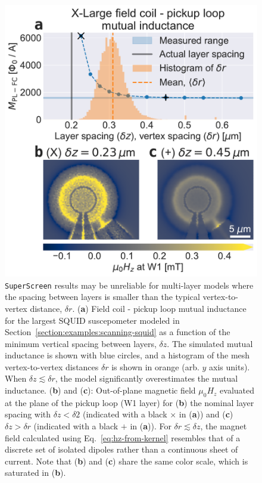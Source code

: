 \documentclass[final,3p,times,twocolumn]{elsarticle}
\newcommand{\inline}[1]{\texttt{#1}\xspace}
\newcommand{\SuperScreen}{\inline{SuperScreen}}
\newcounter{bla}
\begin{document}
\begin{figure}[t]
    \centering
    \includegraphics[width=\linewidth]{examples/images/xlarge-dz-dr.pdf}
    \caption{\SuperScreen results may be unreliable for multi-layer models where the spacing between layers is smaller than the typical vertex-to-vertex distance, $\delta r$. ({\bf a}) Field coil - pickup loop mutual inductance for the largest SQUID suscepometer modeled in Section~\ref{section:examples:scanning-squid} as a function of the minimum vertical spacing between layers, $\delta z$. The simulated mutual inductance is shown with blue circles, and a histogram of the mesh vertex-to-vertex distances $\delta r$ is shown in orange (arb. $y$ axis units). When $\delta z\lesssim\delta r$, the model significantly overestimates the mutual inductance. ({\bf b}) and ({\bf c}): Out-of-plane magnetic field $\mu_0H_z$ evaluated at the plane of the pickup loop (W1 layer) for ({\bf b}) the nominal layer spacing with $\delta z<\delta 2$ (indicated with a black $\times$ in ({\bf a})) and ({\bf c}) $\delta z > \delta r$ (indicated with a black $+$ in ({\bf a})). For $\delta r\lesssim\delta z$, the magnet field calculated using Eq.~\ref{eq:hz-from-kernel} resembles that of a discrete set of isolated dipoles rather than a continuous sheet of current. Note that ({\bf b}) and ({\bf c}) share the same color scale, which is saturated in ({\bf b}).}
    \label{fig:xlarge-dz-dr}
\end{figure}
\end{document}
